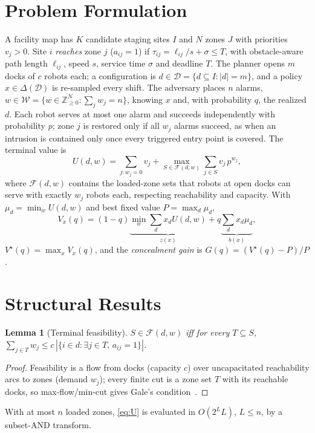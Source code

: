 \documentclass[letterpaper,journal]{IEEEtran}
\newtheorem{lemma}{Lemma}
\theoremstyle{remark}
\newcommand{\D}{\mathcal{D}}
\newcommand{\W}{\mathcal{W}}
\begin{document}
\section{Problem Formulation}\label{sec:model}
A facility map has $K$ candidate staging sites $I$ and $N$ zones $J$ with priorities $v_j>0$. Site $i$ \emph{reaches} zone $j$ ($a_{ij}=1$) if $\tau_{ij}=\ell_{ij}/s+\sigma\le T$, with obstacle-aware path length $\ell_{ij}$, speed $s$, service time $\sigma$ and deadline $T$. The planner opens $m$ docks of $c$ robots each; a configuration is $d\in\D=\{d\subseteq I:|d|=m\}$, and a policy $x\in\Delta(\D)$ is re-sampled every shift. The adversary places $n$ alarms, $w\in\W=\{w\in\mathbb{Z}^N_{\ge0}:\sum_j w_j=n\}$, knowing $x$ and, with probability $q$, the realized $d$. Each robot serves at most one alarm and succeeds independently with probability $p$; zone $j$ is restored only if all $w_j$ alarms succeed, as when an intrusion is contained only once every triggered entry point is covered. The terminal value is
\begin{equation}\label{eq:U}
U(d,w)=\sum_{j:w_j=0}v_j+\max_{S\in\mathcal{F}(d,w)}\sum_{j\in S}v_j\,p^{w_j},
\end{equation}
where $\mathcal{F}(d,w)$ contains the loaded-zone sets that robots at open docks can serve with exactly $w_j$ robots each, respecting reachability and capacity. With $\mu_d=\min_wU(d,w)$ and best fixed value $P=\max_d\mu_d$,
\begin{equation}\label{eq:Vx}
V_x(q)=(1-q)\underbrace{\min_{w}\sum_{d}x_dU(d,w)}_{z(x)}+q\underbrace{\sum_d x_d\mu_d}_{b(x)},
\end{equation}
$V^\star(q)=\max_xV_x(q)$, and the \emph{concealment gain} is $G(q)=(V^\star(q)-P)/P$.

\section{Structural Results}\label{sec:theory}
\begin{lemma}[Terminal feasibility]\label{lem:gale}
$S\in\mathcal{F}(d,w)$ iff for every $T\subseteq S$, $\sum_{j\in T}w_j\le c\,|\{i\in d:\exists j\in T,\,a_{ij}=1\}|$.
\end{lemma}
\begin{proof}
Feasibility is a flow from docks (capacity $c$) over uncapacitated reachability arcs to zones (demand $w_j$); every finite cut is a zone set $T$ with its reachable docks, so max-flow/min-cut gives Gale's condition~\cite{gale1957}.
\end{proof}
With at most $n$ loaded zones, \eqref{eq:U} is evaluated in $O(2^LL)$, $L\le n$, by a subset-AND transform.
\end{document}
